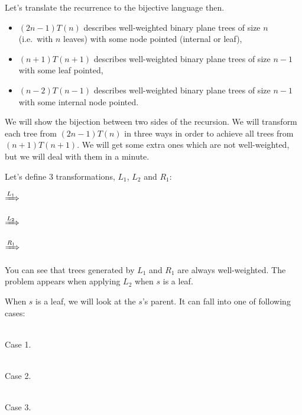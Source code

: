 \documentclass[final]{article}
\theoremstyle{definition}
\theoremstyle{remark}
\newcommand{\includeinlinesvg}[2]{\begin{minipage}{#1\textwidth}\end{minipage}}
\begin{document}
Let's translate the recurrence to the bijective language then.
\begin{itemize}
    \item \((2 n - 1) T(n)\) describes well-weighted binary plane trees of size \(n\) (i.e.\ with \(n\) leaves) with some node pointed (internal or leaf),
    \item \((n + 1) T(n + 1)\) describes well-weighted binary plane trees of size \(n - 1\) with some leaf pointed,
    \item \((n - 2) T(n - 1)\) describes well-weighted binary plane trees of size \(n - 1\) with some internal node pointed.
\end{itemize}

We will show the bijection between two sides of the recursion. We will transform each tree from \((2 n - 1) T(n)\) in three ways in order to achieve all trees from \((n + 1) T(n + 1)\). We will get some extra ones which are not well-weighted, but we will deal with them in a minute.

Let's define 3 transformations, \(L_1\), \(L_2\) and \(R_1\):

\begin{center}
    \includeinlinesvg{.16}{schroder__lr_base}%
    \(\xRightarrow{L_1}\)%
    \includeinlinesvg{.16}{schroder__l1}%
    \hspace{.1\textwidth}%
    \includeinlinesvg{.16}{schroder__lr_base}%
    \(\xRightarrow{L_2}\)%
    \includeinlinesvg{.16}{schroder__l2}%

    \includeinlinesvg{.16}{schroder__lr_base}%
    \(\xRightarrow{R_1}\)%
    \includeinlinesvg{.16}{schroder__r1}%
\end{center}

You can see that trees generated by \(L_1\) and \(R_1\) are always well-weighted. The problem appears when applying \(L_2\) when \(s\) is a leaf.

When \(s\) is a leaf, we will look at the \(s\)'s parent. It can fall into one of following cases:

\begin{center}
    \begin{minipage}[t]{.3\textwidth}
        \begin{center}
            \\
            Case 1.
        \end{center}
    \end{minipage}%
    \begin{minipage}[t]{.3\textwidth}
        \begin{center}
            \\
            Case 2.
        \end{center}
    \end{minipage}%
    \begin{minipage}[t]{.3\textwidth}
        \begin{center}
            \\
            Case 3.
        \end{center}
    \end{minipage}%
\end{center}
\end{document}
